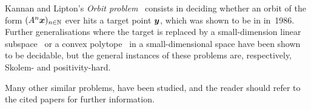 Kannan and Lipton's \emph{Orbit problem}~\cite{KL86} consists in deciding whether an orbit of the form $(A^{n} \boldsymbol{x})_{n \in \mathbb{N}}$ ever hits a target point $\boldsymbol{y}$, which was shown to be in \PTIME{} in~1986. Further generalisations where the target is replaced by a small-dimension linear subspace~\cite{COW13} or a convex polytope~\cite{COW15:SODA} in a small-dimensional space have been shown to be decidable, but the general instances of these problems are, respectively, Skolem- and positivity-hard.

Many other similar problems, have been studied, and the reader should refer to the cited papers for further information.
